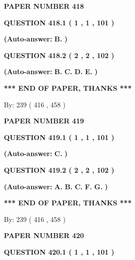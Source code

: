 \documentclass[12pt]{article}
\begin{document}
   
   
   
\newpage 
\setcounter{page}{ 
   418001 } 
   
   
 {\textbf{ \Large{ PAPER NUMBER  418  }}}
   
   
  
  
{\textbf{\large{QUESTION
418.1 
 ( 1 , 1 , 101 )
}}}
 
 
{\textbf{(Auto-answer:}}
{\textbf{\large{
B.}}}
{\textbf{)}}
 
 
  
  
{\textbf{\large{QUESTION
418.2 
 ( 2 , 2 , 102 )
}}}
 
 
{\textbf{(Auto-answer:}}
{\textbf{\large{
B.}}}
{\textbf{\large{
C.}}}
{\textbf{\large{
D.}}}
{\textbf{\large{
E.}}}
{\textbf{)}}
 
 
   
   
\vspace{1.0in} 
{\textbf{\large{ *** END OF PAPER, THANKS *** }}} 
   
   
\hspace{1.0in} By: 
 239 ( 416 ,  458 )
   
   
   
   
\newpage 
\setcounter{page}{ 
   419001 } 
   
   
 {\textbf{ \Large{ PAPER NUMBER  419  }}}
   
   
  
  
{\textbf{\large{QUESTION
419.1 
 ( 1 , 1 , 101 )
}}}
 
 
{\textbf{(Auto-answer:}}
{\textbf{\large{
C.}}}
{\textbf{)}}
 
 
  
  
{\textbf{\large{QUESTION
419.2 
 ( 2 , 2 , 102 )
}}}
 
 
{\textbf{(Auto-answer:}}
{\textbf{\large{
A.}}}
{\textbf{\large{
B.}}}
{\textbf{\large{
C.}}}
{\textbf{\large{
F.}}}
{\textbf{\large{
G.}}}
{\textbf{)}}
 
 
   
   
\vspace{1.0in} 
{\textbf{\large{ *** END OF PAPER, THANKS *** }}} 
   
   
\hspace{1.0in} By: 
 239 ( 416 ,  458 )
   
   
   
   
\newpage 
\setcounter{page}{ 
   420001 } 
   
   
 {\textbf{ \Large{ PAPER NUMBER  420  }}}
   
   
  
  
{\textbf{\large{QUESTION
420.1 
 ( 1 , 1 , 101 )
}}}
 
\end{document}
